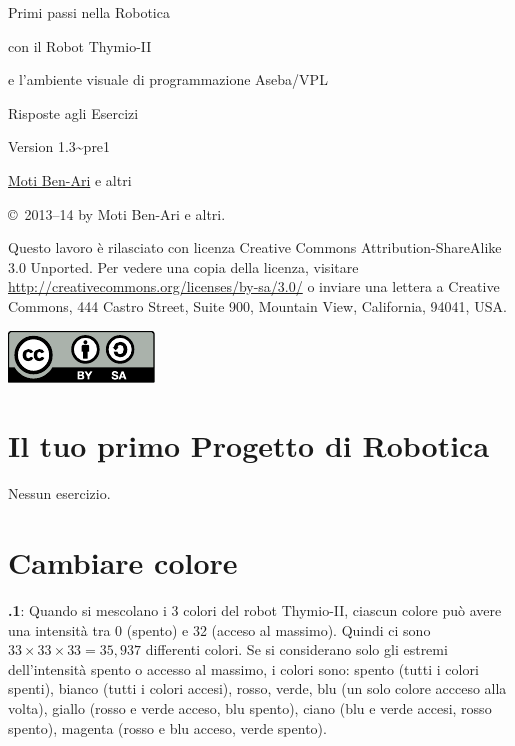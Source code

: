 \documentclass[12pt,a4paper,italian]{article}
\begin{document}
\thispagestyle{empty}

\begin{center}
\begin{bfseries}

\begin{Large}
Primi passi nella Robotica

con il Robot Thymio-II

e l'ambiente visuale di programmazione Aseba/VPL

\bigskip

Risposte agli Esercizi

\end{Large}

Version 1.3{\textasciitilde}pre1

\bigskip

\href{http://www.weizmann.ac.il/sci-tea/benari/}{Moti Ben-Ari} e altri

\end{bfseries}
\end{center}

\bigskip

\copyright{}\  2013--14 by Moti Ben-Ari e altri.

Questo lavoro è rilasciato con licenza Creative Commons
Attribution-ShareAlike 3.0 Unported. Per vedere una copia della
licenza, visitare
\url{http://creativecommons.org/licenses/by-sa/3.0/}
o inviare una lettera a Creative Commons, 444 Castro Street, Suite 900,
Mountain View, California, 94041, USA.

\begin{center}
\hspace{6pt}\includegraphics[width=.2\textwidth]{../images/by-sa}
\end{center}

\section{Il tuo primo Progetto di Robotica}

Nessun esercizio.

\section{Cambiare colore}

\textbf{\thesection.1}: 
Quando si mescolano i 3 colori del robot
Thymio-II, ciascun colore può avere una intensità tra 0 (spento) e
32 (acceso al massimo). Quindi ci sono $33 \times 33 \times 33=35,937$
differenti colori. Se si considerano solo gli estremi dell'intensità
spento o accesso al massimo, i colori sono: spento (tutti i colori
spenti), bianco (tutti i colori accesi), rosso, verde, blu (un solo
colore accceso alla volta), giallo (rosso e verde acceso, blu spento),
ciano (blu e verde accesi, rosso spento), magenta (rosso e blu acceso,
verde spento).
\end{document}
